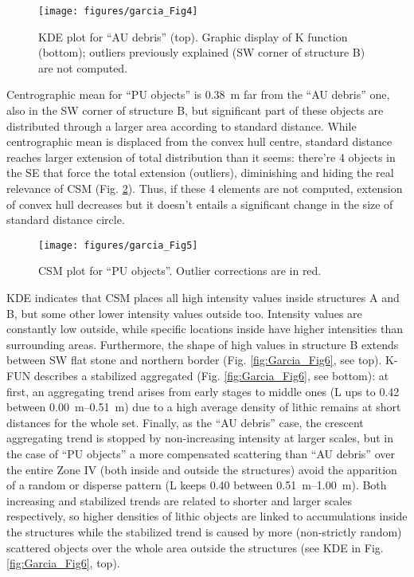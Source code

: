 \begin{figure}
	\texttt{[image: figures/garcia\_Fig4]}
	\centering
	\caption{KDE plot for “AU debris” (top). Graphic display of K function (bottom); outliers previously explained (SW corner of structure B) are not computed.}
	\label{fig:Garcia_Fig4}
\end{figure}

Centrographic mean for “PU objects” is \SI{0.38}{\metre} far from the “AU debris” one, also in the SW corner of structure B, but significant part of these objects are distributed through a larger area according to standard distance. While centrographic mean is displaced from the convex hull centre, standard distance reaches larger extension of total distribution than it seems: there’re \num{4} objects in the SE that force the total extension (outliers), diminishing and hiding the real relevance of CSM (Fig. \ref{fig:Garcia_Fig5}). Thus, if these \num{4} elements are not computed, extension of convex hull decreases but it doesn’t entails a significant change in the size of standard distance circle.

\begin{figure}
	\texttt{[image: figures/garcia\_Fig5]}
	\centering
	\caption{CSM plot for “PU objects”. Outlier corrections are in red.}
	\label{fig:Garcia_Fig5}
\end{figure}

KDE indicates that CSM places all high intensity values inside structures A and B, but some other lower intensity values outside too. Intensity values are constantly low outside, while specific locations inside have higher intensities than surrounding areas. Furthermore, the shape of high values in structure B extends between SW flat stone and northern border (Fig. \ref{fig:Garcia_Fig6}, see top). K-FUN describes a stabilized aggregated (Fig. \ref{fig:Garcia_Fig6}, see bottom): at first, an aggregating trend arises from early stages to middle ones (L ups to 0.42 between \SIrange{0.00}{0.51}{\metre}) due to a high average density of lithic remains at short distances for the whole set. Finally, as the “AU debris” case, the crescent aggregating trend is stopped by non-increasing intensity at larger scales, but in the case of “PU objects” a more compensated scattering than “AU debris” over the entire Zone IV (both inside and outside the structures) avoid the apparition of a random or disperse pattern (L keeps 0.40 between \SIrange{0.51}{1.00}{\metre}). Both increasing and stabilized trends are related to shorter and larger scales respectively, so higher densities of lithic objects are linked to accumulations inside the structures while the stabilized trend is caused by more (non-strictly random) scattered objects over the whole area outside the structures (see KDE in Fig. \ref{fig:Garcia_Fig6}, top).

